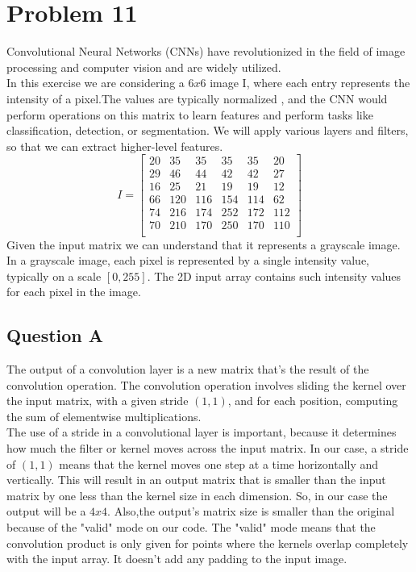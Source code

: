 \section{Problem 11}
Convolutional Neural Networks (CNNs) have revolutionized in the field of image processing and computer vision and are widely utilized.\\

In this exercise we are considering a $6 x 6$ image I, where each entry represents the intensity of a pixel.The values are typically normalized , and the CNN would perform operations on this matrix to learn features and perform tasks like classification, detection, or segmentation. We will apply various layers and filters, so that we can extract higher-level features.\\


\begin{equation}
	I = \begin{bmatrix}
		20 & 35 & 35 & 35 & 35 & 20 \\
		29 & 46 & 44 & 42 & 42 & 27 \\
		16 & 25 & 21 & 19 & 19 & 12 \\
		66 & 120 & 116 & 154 & 114 & 62 \\
		74 & 216 & 174 & 252 & 172 & 112 \\
		70 & 210 & 170 & 250 & 170 & 110 \\
	\end{bmatrix}
\end{equation}
Given the input matrix we can understand that it represents a grayscale image. In a grayscale image, each pixel is represented by a single intensity value, typically on a scale $\left[0, 255\right]$. The 2D input array contains such intensity values for each pixel in the image.

\subsection{Question A}
The output of a convolution layer is a new matrix that's the result of the convolution operation. The convolution operation involves sliding the kernel over the input matrix, with a given stride $\left(1,1\right)$, and for each position, computing the sum of elementwise multiplications. \\

The use of a stride in a convolutional layer is important, because it determines how much the filter or kernel moves across the input matrix. In our case, a stride of $\left(1,1\right)$ means that the kernel moves one step at a time horizontally and vertically. This will result in an output matrix that is smaller than the input matrix by one less than the kernel size in each dimension. So, in our case the output will be a $4 x 4$. Also,the output's matrix size is smaller than the original because of the "valid" mode on our code. The "valid" mode means that the convolution product is only given for points where the kernels overlap completely with the input array. It doesn't add any padding to the input image.\\


